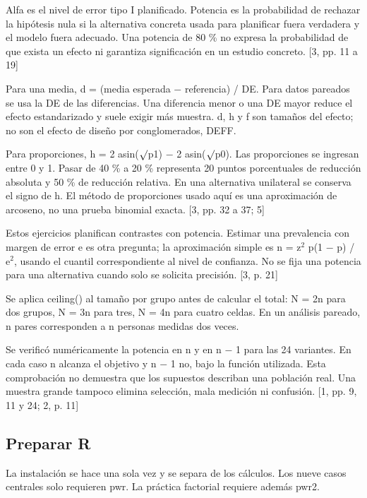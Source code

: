 \documentclass[10pt,a4paper]{article}
\begin{document}
Alfa es el nivel de error tipo I planificado. Potencia es la probabilidad de rechazar la hipótesis nula si la alternativa concreta usada para planificar fuera verdadera y el modelo fuera adecuado. Una potencia de 80 \% no expresa la probabilidad de que exista un efecto ni garantiza significación en un estudio concreto. [3, pp. 11 a 19]

Para una media, d = (media esperada \ensuremath{-} referencia) / DE. Para datos pareados se usa la DE de las diferencias. Una diferencia menor o una DE mayor reduce el efecto estandarizado y suele exigir más muestra. d, h y f son tamaños del efecto; no son el efecto de diseño por conglomerados, DEFF.

Para proporciones, h = 2 asin(\ensuremath{\surd}p1) \ensuremath{-} 2 asin(\ensuremath{\surd}p0). Las proporciones se ingresan entre 0 y 1. Pasar de 40 \% a 20 \% representa 20 puntos porcentuales de reducción absoluta y 50 \% de reducción relativa. En una alternativa unilateral se conserva el signo de h. El método de proporciones usado aquí es una aproximación de arcoseno, no una prueba binomial exacta. [3, pp. 32 a 37; 5]

Estos ejercicios planifican contrastes con potencia. Estimar una prevalencia con margen de error e es otra pregunta; la aproximación simple es n = z\ensuremath{^2} p(1 \ensuremath{-} p) / e\ensuremath{^2}, usando el cuantil correspondiente al nivel de confianza. No se fija una potencia para una alternativa cuando solo se solicita precisión. [3, p. 21]

Se aplica ceiling() al tamaño por grupo antes de calcular el total: N = 2n para dos grupos, N = 3n para tres, N = 4n para cuatro celdas. En un análisis pareado, n pares corresponden a n personas medidas dos veces.

Se verificó numéricamente la potencia en n y en n \ensuremath{-} 1 para las 24 variantes. En cada caso n alcanza el objetivo y n \ensuremath{-} 1 no, bajo la función utilizada. Esta comprobación no demuestra que los supuestos describan una población real. Una muestra grande tampoco elimina selección, mala medición ni confusión. [1, pp. 9, 11 y 24; 2, p. 11]

\clearpage
\subsection*{Preparar R}

La instalación se hace una sola vez y se separa de los cálculos. Los nueve casos centrales solo requieren pwr. La práctica factorial requiere además pwr2.
\end{document}

